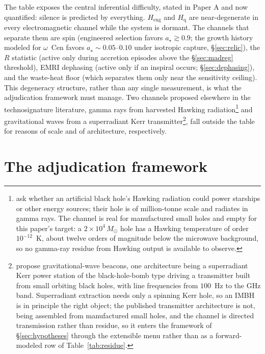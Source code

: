 \documentclass[11pt]{article}
\newcommand{\msun}{\ensuremath{M_\odot}}
\newcommand{\astar}{\ensuremath{a_\star}}
\newcommand{\ocen}{\ensuremath{\omega}~Cen}
\newcommand{\Heng}{\ensuremath{H_{\mathrm{eng}}}}
\newcommand{\Hgas}{\ensuremath{H_{\mathrm{q}}}}
\begin{document}
The table exposes the central inferential difficulty, stated in Paper A and now quantified: silence is predicted by everything. \Heng{} and \Hgas{} are near-degenerate in every electromagnetic channel while the system is dormant. The channels that separate them are spin (engineered selection favors $\astar \gtrsim 0.9$; the growth history modeled for \ocen{} favors $\astar \sim 0.05$--$0.10$ under isotropic capture, \S\ref{sec:relic}), the $R$ statistic (active only during accretion episodes above the \S\ref{sec:madreg} threshold), EMRI dephasing (active only if an inspiral occurs; \S\ref{sec:dephasing}), and the waste-heat floor (which separates them only near the sensitivity ceiling). This degeneracy structure, rather than any single measurement, is what the adjudication framework must manage. Two channels proposed elsewhere in the technosignature literature, gamma rays from harvested Hawking radiation\footnote{\citet{Crane2009} ask whether an artificial black hole's Hawking radiation could power starships or other energy sources; their hole is of million-tonne scale and radiates in gamma rays. The channel is real for manufactured small holes and empty for this paper's target: a $2\times10^{4}\,\msun$ hole has a Hawking temperature of order $10^{-12}$~K, about twelve orders of magnitude below the microwave background, so no gamma-ray residue from Hawking output is available to observe.} and gravitational waves from a superradiant Kerr transmitter\footnote{\citet{JacksonBenford2020} propose gravitational-wave beacons, one architecture being a superradiant Kerr power station of the black-hole-bomb type driving a transmitter built from small orbiting black holes, with line frequencies from $100$~Hz to the GHz band. Superradiant extraction needs only a spinning Kerr hole, so an IMBH is in principle the right object; the published transmitter architecture is not, being assembled from manufactured small holes, and the channel is directed transmission rather than residue, so it enters the framework of \S\ref{sec:hypotheses} through the extensible menu rather than as a forward-modeled row of Table~\ref{tab:residue}.}, fall outside the table for reasons of scale and of architecture, respectively.

\section{The adjudication framework}
\label{sec:adjudication}
\end{document}
